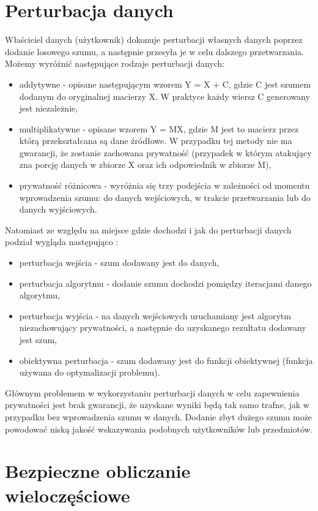 \section{Perturbacja danych}
Właściciel danych (użytkownik) dokonuje perturbacji własnych danych poprzez dodanie losowego szumu, a następnie przesyła je w celu dalszego przetwarzania.
Możemy wyróżnić następujące rodzaje perturbacji danych:
\begin{itemize}
    \item addytywne - opisane następującym wzorem 
    Y = X + C, gdzie C jest szumem dodanym do oryginalnej macierzy X. W praktyce każdy wiersz C generowany jest niezależnie,
    \item multiplikatywne - opisane wzorem Y = MX, gdzie M jest to macierz przez którą przekształcana są dane źródłowe. W przypadku tej metody nie ma gwarancji, że zostanie zachowana prywatność (przypadek w którym atakujący zna porcję danych w zbiorze X oraz ich odpowiednik w zbiorze M),
    \item prywatność różnicowa - wyróżnia się trzy podejścia w zależności od momentu wprowadzenia szumu: do danych wejściowych, w trakcie przetwarzania lub do danych wyjściowych.
\end{itemize}

Natomiast ze względu na miejsce gdzie dochodzi i jak do perturbacji danych podział wygląda następująco \cite{PPML}:
\begin{itemize}
    \item perturbacja wejścia - szum dodawany jest do danych,
    \item perturbacja algorytmu - dodanie szumu dochodzi pomiędzy iteracjami danego algorytmu,
    \item perturbacja wyjścia - na danych wejściowych uruchamiany jest algorytm niezachowujący prywatności, a następnie do uzyskanego rezultatu dodawany jest szum,
    \item obiektywna perturbacja - szum dodawany jest do funkcji obiektywnej (funkcja używana do optymalizacji problemu).
\end{itemize}

Głównym problemem w wykorzystaniu perturbacji danych w celu zapewnienia prywatności jest brak gwarancji, że uzyskane wyniki będą tak samo trafne, jak w przypadku bez wprowadzenia szumu w danych. Dodanie zbyt dużego szumu może powodować niską jakość wskazywania podobnych użytkowników lub przedmiotów.



\section{Bezpieczne obliczanie wieloczęściowe}

